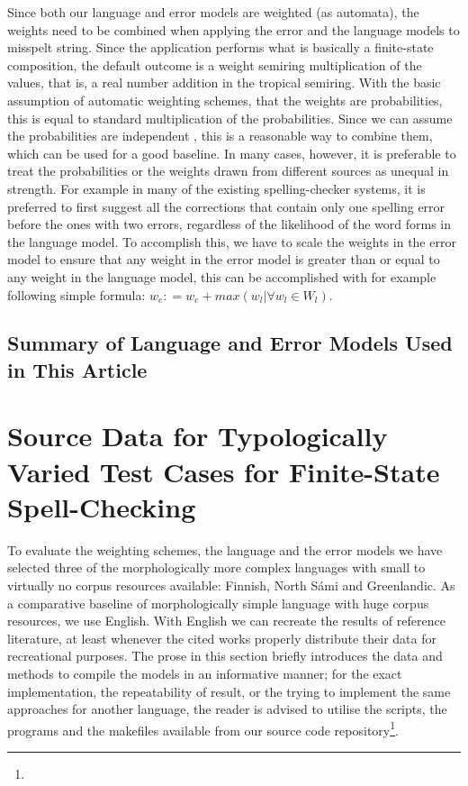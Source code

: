 \documentclass[a4paper,12pt]{article}
\begin{document}
Since both our language and error models are weighted (as automata), the
weights need to be combined when applying the error and the language models to
misspelt string. Since the application performs what is basically a
finite-state composition, the default outcome is a weight semiring
multiplication of the values, that is, a real number addition in the tropical
semiring. With the basic assumption of automatic weighting schemes, that the
weights are probabilities, this is equal to standard multiplication of the
probabilities. Since we can assume the probabilities are independent
\cite[]{church1991probability}, this is a reasonable way to combine them, which
can be used for a good baseline. In many cases, however, it is preferable to
treat the probabilities or the weights drawn from different sources as unequal in
strength. For example in many of the existing spelling-checker systems, it is
preferred to first suggest all the corrections that contain only one spelling error
before the ones with two errors, regardless of the likelihood of the word forms
in the language model. To accomplish this, we have to scale the weights in the
error model to ensure that any weight in the error model is greater than or equal
to any weight in the language model, this can be accomplished with for example
following simple formula: $w_e \mathrel{\mathop:}= w_e + max(w_l | \forall w_l
\in W_l)$.

\subsection{Summary of Language and Error Models Used in This Article}



\section{Source Data for Typologically Varied Test Cases for Finite-State
Spell-Checking}
\label{sec:material}

To evaluate the weighting schemes, the language and the error models we have
selected three of the morphologically more complex languages with small to
virtually no corpus resources available: Finnish, North Sámi and Greenlandic.
As a comparative baseline of morphologically simple language with huge corpus
resources, we use English.  With English we can recreate the results of
reference literature, at least whenever the cited works properly distribute
their data for recreational purposes. The prose in this section briefly
introduces the data and methods to compile the models in an informative manner;
for the exact implementation, the repeatability of result, or the trying to
implement the same approaches for another language, the reader is advised to
utilise the scripts, the programs and the makefiles available from our source
code repository\footnote{}.
\end{document}
